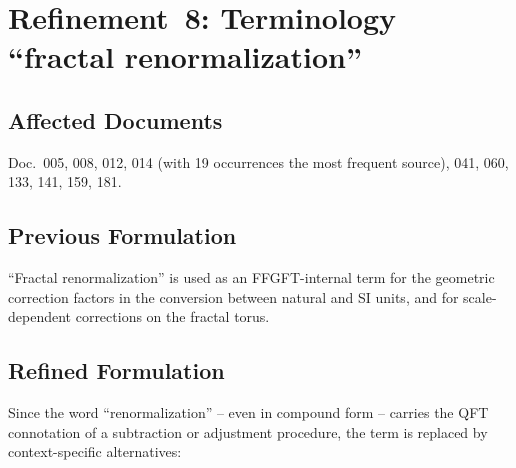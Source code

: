 \section{\texorpdfstring{Refinement~8: Terminology \enquote{fractal renormalization}}{Refinement 8: Terminology fractal renormalization}}

\subsection*{Affected Documents}

Doc.~005, 008, 012, 014 (with 19 occurrences the most frequent source),
041, 060, 133, 141, 159, 181.

\subsection*{Previous Formulation}

\enquote{Fractal renormalization} is used as an FFGFT-internal term for
the geometric correction factors in the conversion between
natural and SI units, and for scale-dependent corrections
on the fractal torus.

\subsection*{Refined Formulation}

Since the word \enquote{renormalization} -- even in compound form --
carries the QFT connotation of a subtraction or adjustment procedure,
the term is replaced by context-specific alternatives:

\begin{center}
{\footnotesize
{}
}
\end{center}


